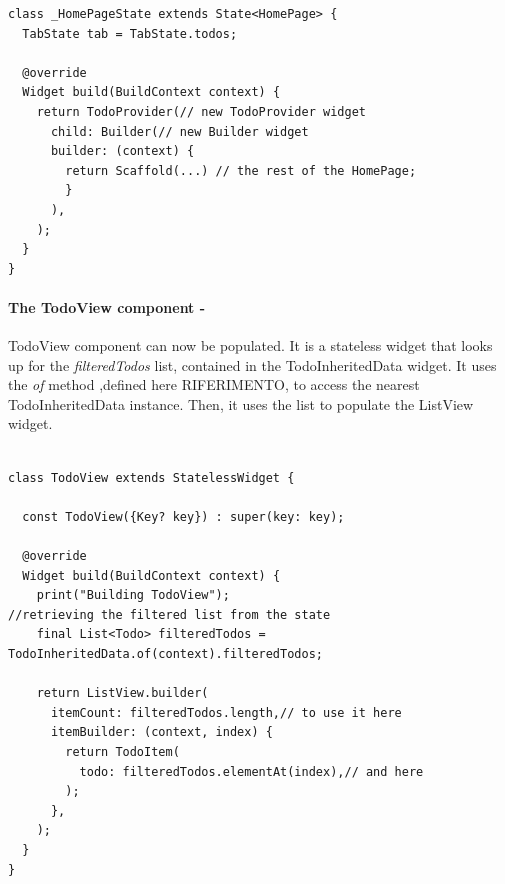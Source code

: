 \begin{code}

 \mbox{}

\label{code:2.20}
\begin{verbatim}
class _HomePageState extends State<HomePage> {
  TabState tab = TabState.todos;

  @override
  Widget build(BuildContext context) {
    return TodoProvider(// new TodoProvider widget
      child: Builder(// new Builder widget
      builder: (context) {
        return Scaffold(...) // the rest of the HomePage;      
        }
      ),
    );
  }
}
\end{verbatim}
\end{code}
\paragraph{The TodoView component - }
\label{subpar:todo_app_inherited_widget_todoview_component}
TodoView component can now be populated. It is a stateless widget that looks up for the \textit{filteredTodos} list, contained in the TodoInheritedData widget. It uses the \textit{of} method ,defined here RIFERIMENTO, to access the nearest TodoInheritedData instance. Then, it uses the list to populate the ListView widget. 
\mbox{}\\

\begin{code}
 \mbox{}

\label{code:2.21}
\begin{verbatim}

class TodoView extends StatelessWidget {

  const TodoView({Key? key}) : super(key: key);

  @override
  Widget build(BuildContext context) {
    print("Building TodoView");
//retrieving the filtered list from the state
    final List<Todo> filteredTodos = TodoInheritedData.of(context).filteredTodos;

    return ListView.builder(
      itemCount: filteredTodos.length,// to use it here
      itemBuilder: (context, index) {
        return TodoItem(
          todo: filteredTodos.elementAt(index),// and here
        );
      },
    );
  }
}
\end{verbatim}
\end{code}

